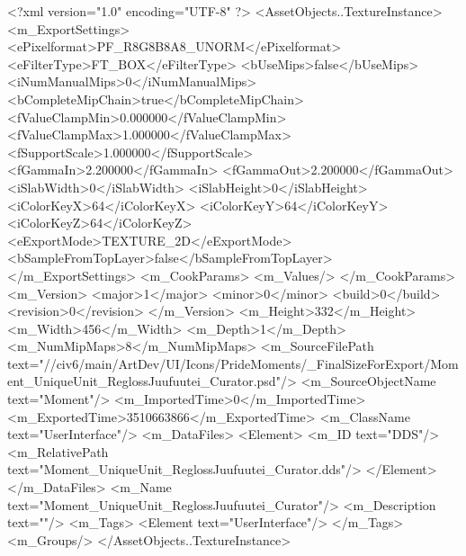 <?xml version="1.0" encoding="UTF-8" ?>
<AssetObjects..TextureInstance>
	<m_ExportSettings>
		<ePixelformat>PF_R8G8B8A8_UNORM</ePixelformat>
		<eFilterType>FT_BOX</eFilterType>
		<bUseMips>false</bUseMips>
		<iNumManualMips>0</iNumManualMips>
		<bCompleteMipChain>true</bCompleteMipChain>
		<fValueClampMin>0.000000</fValueClampMin>
		<fValueClampMax>1.000000</fValueClampMax>
		<fSupportScale>1.000000</fSupportScale>
		<fGammaIn>2.200000</fGammaIn>
		<fGammaOut>2.200000</fGammaOut>
		<iSlabWidth>0</iSlabWidth>
		<iSlabHeight>0</iSlabHeight>
		<iColorKeyX>64</iColorKeyX>
		<iColorKeyY>64</iColorKeyY>
		<iColorKeyZ>64</iColorKeyZ>
		<eExportMode>TEXTURE_2D</eExportMode>
		<bSampleFromTopLayer>false</bSampleFromTopLayer>
	</m_ExportSettings>
	<m_CookParams>
		<m_Values/>
	</m_CookParams>
	<m_Version>
		<major>1</major>
		<minor>0</minor>
		<build>0</build>
		<revision>0</revision>
	</m_Version>
	<m_Height>332</m_Height>
	<m_Width>456</m_Width>
	<m_Depth>1</m_Depth>
	<m_NumMipMaps>8</m_NumMipMaps>
	<m_SourceFilePath text="//civ6/main/ArtDev/UI/Icons/PrideMoments/_FinalSizeForExport/Moment_UniqueUnit_ReglossJuufuutei_Curator.psd"/>
	<m_SourceObjectName text="Moment"/>
	<m_ImportedTime>0</m_ImportedTime>
	<m_ExportedTime>3510663866</m_ExportedTime>
	<m_ClassName text="UserInterface"/>
	<m_DataFiles>
		<Element>
			<m_ID text="DDS"/>
			<m_RelativePath text="Moment_UniqueUnit_ReglossJuufuutei_Curator.dds"/>
		</Element>
	</m_DataFiles>
	<m_Name text="Moment_UniqueUnit_ReglossJuufuutei_Curator"/>
	<m_Description text=""/>
	<m_Tags>
		<Element text="UserInterface"/>
	</m_Tags>
	<m_Groups/>
</AssetObjects..TextureInstance>

